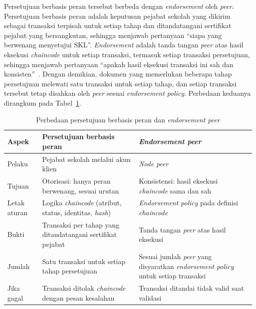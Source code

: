 Persetujuan berbasis peran tersebut berbeda dengan \textit{endorsement} oleh \textit{peer}. Persetujuan berbasis peran adalah keputusan pejabat sekolah yang dikirim sebagai transaksi terpisah untuk setiap tahap dan ditandatangani sertifikat pejabat yang bersangkutan, sehingga menjawab pertanyaan ``siapa yang berwenang menyetujui SKL''. \textit{Endorsement} adalah tanda tangan \textit{peer} atas hasil eksekusi \textit{chaincode} untuk setiap transaksi, termasuk setiap transaksi persetujuan, sehingga menjawab pertanyaan ``apakah hasil eksekusi transaksi ini sah dan konsisten''~\cite{FabricEndorsement}. Dengan demikian, dokumen yang memerlukan beberapa tahap persetujuan melewati satu transaksi untuk setiap tahap, dan setiap transaksi tersebut tetap disahkan oleh \textit{peer} sesuai \textit{endorsement policy}. Perbedaan keduanya dirangkum pada Tabel~\ref{table:2.endorsement}.

\begin{table}[H]
    \centering
    \caption{Perbedaan persetujuan berbasis peran dan \textit{endorsement peer}}
    \label{table:2.endorsement}
    \footnotesize
    \renewcommand{\arraystretch}{1.25}
    \begin{tabular}{|>{\raggedright\arraybackslash}p{}|>{\raggedright\arraybackslash}p{}|>{\raggedright\arraybackslash}p{}|}
        \hline
        \textbf{Aspek} & \textbf{Persetujuan berbasis peran} & \textbf{\textit{Endorsement peer}} \\
        \hline
        Pelaku & Pejabat sekolah melalui akun klien & \textit{Node peer} \\
        \hline
        Tujuan & Otorisasi: hanya peran berwenang, sesuai urutan & Konsistensi: hasil eksekusi \textit{chaincode} sama dan sah \\
        \hline
        Letak aturan & Logika \textit{chaincode} (atribut, status, identitas, \textit{hash}) & \textit{Endorsement policy} pada definisi \textit{chaincode} \\
        \hline
        Bukti & Transaksi per tahap yang ditandatangani sertifikat pejabat & Tanda tangan \textit{peer} atas hasil eksekusi \\
        \hline
        Jumlah & Satu transaksi untuk setiap tahap persetujuan & Sesuai jumlah \textit{peer} yang disyaratkan \textit{endorsement policy} untuk setiap transaksi \\
        \hline
        Jika gagal & Transaksi ditolak \textit{chaincode} dengan pesan kesalahan & Transaksi ditandai tidak valid saat validasi \\
        \hline
    \end{tabular}
\end{table}


